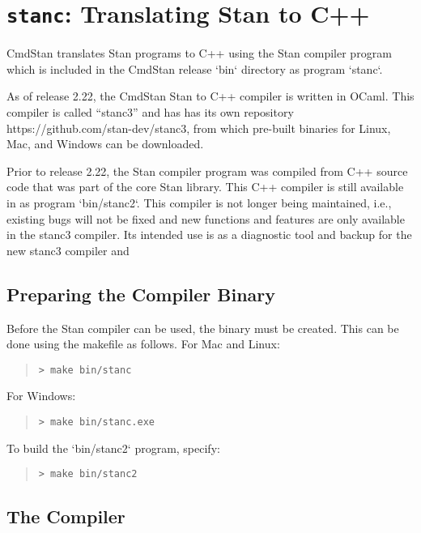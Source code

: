 \chapter{{\tt\bfseries stanc}: Translating Stan to C++}\label{stanc.chapter}


CmdStan  translates Stan programs to C++ using the Stan compiler program which
is included in the CmdStan release `bin` directory as program `stanc`.

As of release 2.22, the CmdStan Stan to C++ compiler is 
written in OCaml.
This compiler is called ``stanc3'' and has has its own repository
https://github.com/stan-dev/stanc3, from which pre-built binaries
for Linux, Mac, and Windows can be downloaded.

Prior to release 2.22, the Stan compiler program was compiled from C++ source code
that was part of the core Stan library.
This C++ compiler is still available in as program `bin/stanc2`.
This compiler is not longer being maintained, i.e., existing bugs will not be fixed
and new functions and features are only available in the stanc3 compiler.
Its intended use is as a diagnostic tool and backup for the new stanc3 compiler and

\section{Preparing the \stanc Compiler Binary}

Before the Stan compiler can be used, the binary \stanc must be created.
This can be done using the makefile as follows. For Mac and Linux:
%
\begin{quote}
\begin{Verbatim}[fontshape=sl]
> make bin/stanc
\end{Verbatim}
\end{quote}
%
For Windows:
%
\begin{quote}
\begin{Verbatim}[fontshape=sl]
> make bin/stanc.exe
\end{Verbatim}
\end{quote}
%
To build the `bin/stanc2` program,  specify:
%
\begin{quote}
\begin{Verbatim}[fontshape=sl]
> make bin/stanc2
\end{Verbatim}
\end{quote}
%


\section{The \stanc Compiler}

